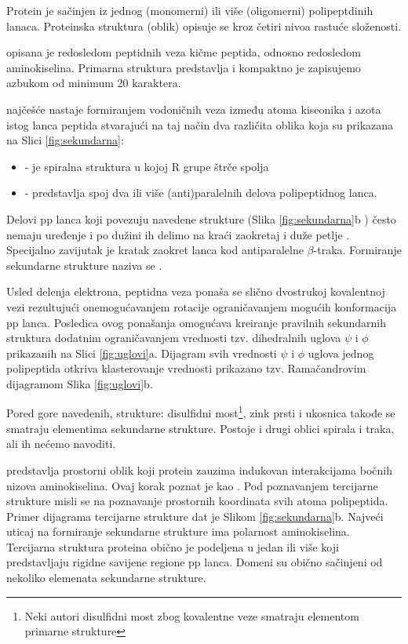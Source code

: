 Protein je sačinjen iz jednog (monomerni) ili više (oligomerni) polipeptdinih lanaca.
Proteinska struktura (oblik) opisuje se kroz četiri nivoa rastuće složenosti.

 opisana je redosledom peptidnih veza kičme peptida,
odnosno redosledom aminokiselina. Primarna struktura predstavlja  i kompaktno je zapisujemo azbukom od minimum 20 karaktera.

 najčešće nastaje formiranjem vodoničnih veza
između atoma kiseonika i azota istog lanca peptida stvarajući na taj način
dva različita oblika koja su prikazana na Slici \ref{fig:sekundarna}:
\begin{itemize}
  \item {} - je spiralna struktura u kojoj R grupe štrče spolja
  \item {}  - predstavlja spoj dva ili više (anti)paralelnih delova polipeptidnog lanca.
\end{itemize}
Delovi pp lanca  koji povezuju navedene strukture (Slika \ref{fig:sekundarna}b ) često nemaju uređenje i po dužini ih delimo na kraći zaokretaj i duže
petlje . Specijalno zavijutak  je
kratak zaokret lanca kod antiparalelne $\beta$-traka.
Formiranje sekundarne strukture naziva se .

Usled delenja elektrona,  peptidna veza ponaša se slično dvostrukoj kovalentnoj
vezi rezultujući onemogućavanjem rotacije ograničavanjem mogućih konformacija pp lanca.
Posledica ovog ponašanja omogućava kreiranje pravilnih sekundarnih struktura
dodatnim ograničavanjem vrednosti tzv.  dihedralnih uglova $\psi$ i $\phi$ prikazanih
na Slici \ref{fig:uglovi}a.  Dijagram svih vrednosti $\psi$ i $\phi$ uglova
jednog polipeptida otkriva klasterovanje vrednosti prikazano tzv. Ramačandrovim
dijagramom Slika \ref{fig:uglovi}b.

Pored gore navedenih, strukture: disulfidni most\footnote{Neki autori
disulfidni most zbog kovalentne veze smatraju elementom primarne strukture},
zink prsti i ukosnica takođe se smatraju elementima sekundarne strukture.
Postoje i drugi oblici spirala i traka, ali ih nećemo navoditi.




 predstavlja prostorni oblik koji protein zauzima
indukovan interakcijama bočnih nizova aminokiselina. Ovaj korak poznat je kao
 .  Pod poznavanjem tercijarne strukture misli
se na poznavanje prostornih koordinata svih atoma polipeptida. Primer dijagrama
tercijarne strukture dat je Slikom \ref{fig:sekundarna}b.
Najveći uticaj na formiranje sekundarne strukture ima polarnost aminokiselina.
Tercijarna struktura proteina obično je podeljena u jedan ili više
 koji predstavljaju rigidne savijene regione pp lanca.  Domeni
su obično sačinjeni od nekoliko elemenata sekundarne strukture.

